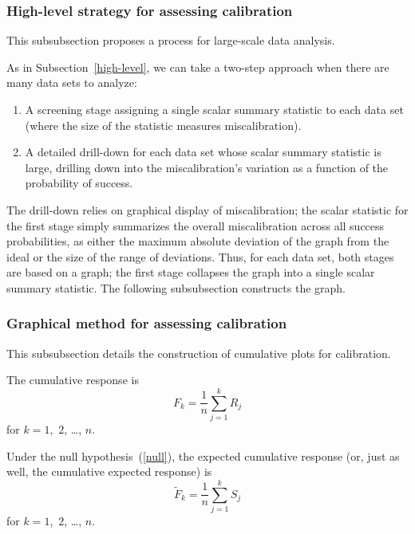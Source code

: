 \documentclass{article}
\begin{document}
\subsubsection{High-level strategy for assessing calibration}
\label{ahigh-level}

This subsubsection proposes a process for large-scale data analysis.

As in Subsection~\ref{high-level}, we can take a two-step approach
when there are many data sets to analyze:
%
\begin{enumerate}
\item A screening stage assigning a single scalar summary statistic
to each data set (where the size of the statistic measures miscalibration).
\item A detailed drill-down for each data set
whose scalar summary statistic is large, drilling down into
the miscalibration's variation as a function of the probability of success.
\end{enumerate}

The drill-down relies on graphical display of miscalibration;
the scalar statistic for the first stage simply summarizes
the overall miscalibration across all success probabilities,
as either the maximum absolute deviation of the graph from the ideal
or the size of the range of deviations.
Thus, for each data set, both stages are based on a graph;
the first stage collapses the graph into a single scalar summary statistic.
The following subsubsection constructs the graph.


\subsubsection{Graphical method for assessing calibration}
\label{agraphical}

This subsubsection details the construction of cumulative plots
for calibration.

The cumulative response is
%
\begin{equation}
\label{cumresponse}
F_k = \frac{1}{n} \sum_{j=1}^k R_j
\end{equation}
%
for $k = 1$,~$2$, \dots, $n$.

Under the null hypothesis~(\ref{null}), the expected cumulative response
(or, just as well, the cumulative expected response) is
%
\begin{equation}
\label{expresponse}
\tilde{F}_k = \frac{1}{n} \sum_{j=1}^k S_j
\end{equation}
%
for $k = 1$,~$2$, \dots, $n$.
\end{document}
